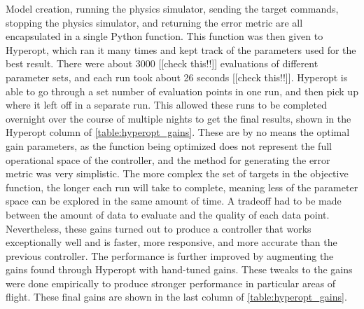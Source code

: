 \documentclass[letterpaper,12pt,titlepage,oneside,final]{book}
\begin{document}
Model creation, running the physics simulator, sending the target commands, stopping the physics simulator, and returning the error metric are all encapsulated in a single Python function. 
This function was then given to Hyperopt, which ran it many times and kept track of the parameters used for the best result. There were about 3000 [[check this!!]] evaluations of different parameter sets, and each run took about 26 seconds [[check this!!]]. 
Hyperopt is able to go through a set number of evaluation points in one run, and then pick up where it left off in a separate run. This allowed these runs to be completed overnight over the course of multiple nights to get the final results, shown in the Hyperopt column of \autoref{table:hyperopt_gains}. 
These are by no means the optimal gain parameters, as the function being optimized does not represent the full operational space of the controller, and the method for generating the error metric was very simplistic. 
The more complex the set of targets in the objective function, the longer each run will take to complete, meaning less of the parameter space can be explored in the same amount of time. 
A tradeoff had to be made between the amount of data to evaluate and the quality of each data point. 
Nevertheless, these gains turned out to produce a controller that works exceptionally well and is faster, more responsive, and more accurate than the previous controller.
The performance is further improved by augmenting the gains found through Hyperopt with hand-tuned gains.
These tweaks to the gains were done empirically to produce stronger performance in particular areas of flight. %
These final gains are shown in the last column of \autoref{table:hyperopt_gains}.

\end{document}
